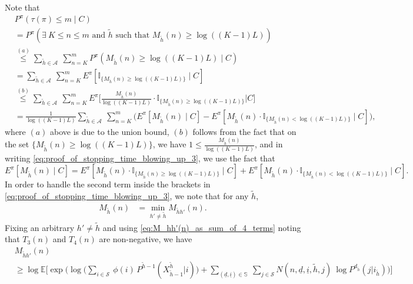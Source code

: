 {\color{black} Note that
\begin{align}
	&P^\pi(\tau(\pi) \leq m \mid C)\nonumber\\
	&=P^\pi(\exists~K\leq n\leq m\text{ and }\tilde{h}\text{ such that }M_{\tilde{h}}(n)\geq \log((K-1)L))\nonumber\\
	&\stackrel{(a)}{\leq} \sum\limits_{\tilde{h}\in \mathcal{A}}~\sum\limits_{n=K}^{m} P^\pi(M_{\tilde{h}}(n) \geq \log((K-1)L)\mid C)\nonumber\\
	 &=\sum\limits_{\tilde{h}\in \mathcal{A}}~\sum\limits_{n=K}^{m} E^\pi[\mathbb{I}_{\{M_{\tilde{h}}(n) \geq \log((K-1)L)\}}\mid C]\nonumber\\
	& \stackrel{(b)}{\leq} \sum\limits_{\tilde{h}\in \mathcal{A}}~\sum\limits_{n=K}^{m}E^\pi\bigg[\frac{M_{\tilde{h}}(n)}{\log((K-1)L)}\cdot \mathbb{I}_{\{M_{\tilde{h}}(n) \geq \log((K-1)L)\}}\bigg | C\bigg]\nonumber\\
	&=\frac{1}{\log ((K-1)L)}\sum\limits_{\tilde{h}\in \mathcal{A}}~\sum\limits_{n=K}^{m} \bigg(E^\pi[M_{\tilde{h}}(n)\mid C] - E^\pi[M_{\tilde{h}}(n)\cdot \mathbb{I}_{\{M_{\tilde{h}}(n) < \log((K-1)L)\}}\mid C]\bigg),
	\label{eq:proof_of_stopping_time_blowing_up_3}
\end{align}
where $(a)$ above is due to the union bound, $(b)$ follows from the fact that on the set $\{M_{\tilde{h}}(n)\geq \log ((K-1)L)\}$, we have $1\leq \frac{M_{\tilde{h}}(n)}{\log ((K-1)L)}$, and in writing \eqref{eq:proof_of_stopping_time_blowing_up_3}, we use the fact that $$ E^\pi[M_{\tilde{h}}(n)\mid C]= E^\pi[M_{\tilde{h}}(n)\cdot \mathbb{I}_{\{M_{\tilde{h}}(n) \geq \log((K-1)L)\}}\mid C] + E^\pi[M_{\tilde{h}}(n)\cdot \mathbb{I}_{\{M_{\tilde{h}}(n) < \log((K-1)L)\}}\mid C].$$ In order to handle the second term inside the brackets in \eqref{eq:proof_of_stopping_time_blowing_up_3}, we note that for any $\tilde{h}$,  
\begin{align}
	M_{\tilde{h}}(n)&=\min\limits_{h'\neq \tilde{h}} M_{\tilde{h}h'}(n).
	\label{eq:proof_of_stopping_time_blowing_up_3_new_1}
\end{align} 
Fixing an arbitrary $h'\neq \tilde{h}$ and using \eqref{eq:M_hh'(n)_as_sum_of_4_terms} noting that $T_3(n)$ and $T_4(n)$ are non-negative, we have 
\begin{align}
	&M_{\tilde{h}h'}(n)\nonumber\\
	&\geq \log \mathbb{E}\bigg[\exp\bigg(\log \bigg(\sum\limits_{i\in \mathcal{S}}~\phi(i)\, P^{\tilde{h}-1}(X_{\tilde{h}-1}^{\tilde{h}}|i)\bigg) + \sum\limits_{(\underline{d}, \underline{i})\in \mathbb{S}}~\sum\limits_{j\in \mathcal{S}}N(n, \underline{d}, \underline{i}, \tilde{h}, j)~ \log P^{d_{\tilde{h}}}(j|i_{\tilde{h}})\bigg)\bigg]

\end{align}}
